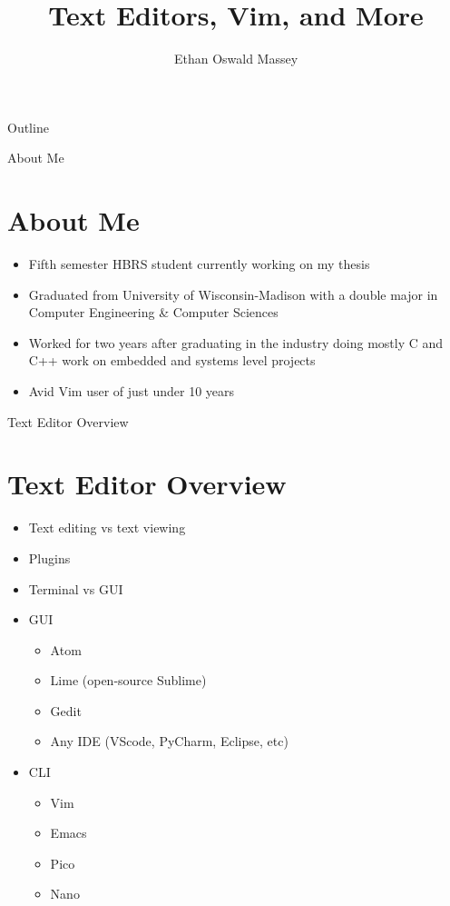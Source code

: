 \documentclass{beamer}
\title{Text Editors, Vim, and More}
\author{Ethan Oswald Massey\inst{1}}
\institute[]
{
  \inst{1}
  Hochschule Bonn-Rhein-Sieg

}
\begin{document}
\begin{frame}
  \titlepage
\end{frame}

\begin{frame}{Outline}
  \tableofcontents
\end{frame}

\begin{frame}{About Me}
  \section{About Me}

  \begin{itemize}\setlength\itemsep{1em}
    \item Fifth semester HBRS student currently working on my thesis
    \item Graduated from University of Wisconsin-Madison with a double major
      in Computer Engineering \& Computer Sciences
    \item Worked for two years after graduating in the industry doing mostly
      C and C++ work on embedded and systems level projects
    \item Avid Vim user of just under 10 years
  \end{itemize}

\end{frame}


\begin{frame}{Text Editor Overview}
  \section{Text Editor Overview}

  \begin{itemize}\setlength\itemsep{1em}
    \item Text editing vs text viewing
    \item Plugins
    \item Terminal vs GUI
  \end{itemize}

  \begin{itemize}\setlength\itemsep{1em}
    \item GUI
      \begin{itemize}
        \item Atom
        \item Lime (open-source Sublime)
        \item Gedit
        \item Any IDE (VScode, PyCharm, Eclipse, etc)
      \end{itemize}
    \item CLI
      \begin{itemize}
        \item Vim
        \item Emacs
        \item Pico
        \item Nano
      \end{itemize}
  \end{itemize}

\end{frame}
\end{document}
